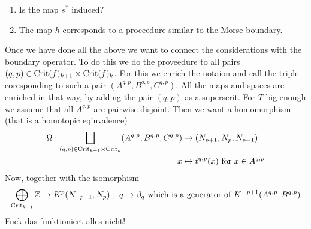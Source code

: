 \begin{cor}
\begin{enumerate}
		\item Is the map $s^*$ induced?
		\item The map $h$ corresponds to a proceedure similar to the Morse boundary.
	\end{enumerate}
	Once we have done all the above we want to connect the considerations with the boundary operator. To do this we do the proveedure to all pairs $(q,p)\in \mathrm{Crit}(f)_{k+1}\times \mathrm{Crit}(f)_k$. For this we enrich the notaion and call the triple coresponding to such a pair $(A^{q,p},B^{q,p},C^{q,p})$. All the maps and spaces are enriched in that way, by adding the pair $(q,p)$ as a superscrit. For $T$ big enough we assume that all $A^{q,p}$ are pairwise disjoint. Then we want a homomorphism (that is a homotopic eqiuvalence) 	
	\begin{align*}
		\Omega:\bigsqcup\limits_{(q,p)\in \mathrm{Crit}_{k+1}\times \mathrm{Crit}_k}(A^{q,p},B^{q,p},C^{q,p}) &\to (N_{p+1},N_p,N_{p-1}) \\
		x& \mapsto t^{q,p}(x) \text{ for }x\in A^{q,p}
	\end{align*}
	Now, together with the isomorphism
	\begin{align*}
		\bigoplus_{\mathrm{Crit}_{k+1}}\mathbb{Z} \to K^p(N_{-p+1},N_p)~,~ q \mapsto \beta_q \text{ which is a generator of } K^{-p+1}(A^{q,p},B^{q,p})
	\end{align*}
	Fuck das funktioniert alles nicht! 
\end{cor}
